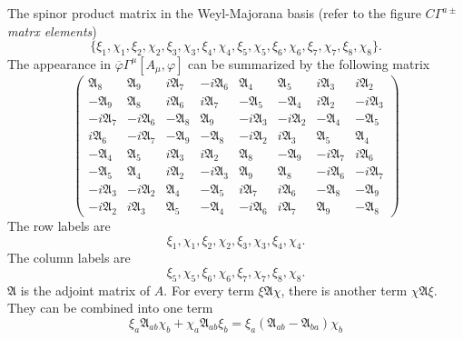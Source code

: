 
\begin{correct}
	The spinor product matrix in the Weyl-Majorana basis
	(refer to the figure \emph{$C\Gamma^{a\pm}$ matrx elements})
	\[
	\{\xi_1,\chi_1,\xi_2,\chi_2,\xi_3,\chi_3,\xi_4,\chi_4,
	\xi_5,\chi_5,\xi_6,\chi_6,\xi_7,\chi_7,\xi_8,\chi_8\}
	.\] 
	The appearance in $\overline{\varphi}\Gamma^\mu [A_\mu,\varphi]$
	can be summarized by the following matrix
	\begin{equation}
		\begin{pmatrix}
		\mathfrak{A}_8	& \mathfrak{A}_9 & i \mathfrak{A}_7 & -i \mathfrak{A}_6 & \mathfrak{A}_4 & \mathfrak{A}_5 & i \mathfrak{A}_3 & i \mathfrak{A}_2 \\
		- \mathfrak{A}_9& \mathfrak{A}_8 & i \mathfrak{A}_6 & i \mathfrak{A}_7 & - \mathfrak{A}_5 & -\mathfrak{A}_4 & i \mathfrak{A}_2 & -i \mathfrak{A}_3 \\
			-i \mathfrak{A}_7& -i \mathfrak{A}_6 & - \mathfrak{A}_8 & \mathfrak{A}_9 & -i \mathfrak{A}_3 & -i \mathfrak{A}_2 & - \mathfrak{A}_4 & - \mathfrak{A}_5 \\
			i \mathfrak{A}_6& -i \mathfrak{A}_7 & - \mathfrak{A}_9 & -\mathfrak{A}_8 & -i \mathfrak{A}_2 & i \mathfrak{A}_3 &  \mathfrak{A}_5 &  \mathfrak{A}_4 \\
			- \mathfrak{A}_4& \mathfrak{A}_5 & i \mathfrak{A}_3 & i \mathfrak{A}_2 & \mathfrak{A}_8 & - \mathfrak{A}_9 & -i \mathfrak{A}_7 & i \mathfrak{A}_6 \\
			- \mathfrak{A}_5& \mathfrak{A}_4 & i \mathfrak{A}_2 & -i \mathfrak{A}_3 & \mathfrak{A}_9 & \mathfrak{A}_8 & -i \mathfrak{A}_6 & -i \mathfrak{A}_7 \\
			-i \mathfrak{A}_3	& -i \mathfrak{A}_2 & \mathfrak{A}_4 & - \mathfrak{A}_5 & i \mathfrak{A}_7 & i \mathfrak{A}_6 & - \mathfrak{A}_8 & - \mathfrak{A}_9 \\
			-i \mathfrak{A}_2& i \mathfrak{A}_3 & \mathfrak{A}_5 & - \mathfrak{A}_4 & -i \mathfrak{A}_6 & i \mathfrak{A}_7 & \mathfrak{A}_9 & - \mathfrak{A}_8 
		\end{pmatrix}
	\end{equation}
The row labels are
\[
\xi_1,\chi_1,\xi_2,\chi_2,\xi_3,\chi_3,\xi_4,\chi_4
.\] 
The column labels are
\[
\xi_5,\chi_5,\xi_6,\chi_6,\xi_7,\chi_7,\xi_8,\chi_8
.\] 
$\mathfrak{A}$ is the adjoint matrix of $A$.
For every term $\xi \mathfrak{A} \chi$, there is another term
$\chi \mathfrak{A} \xi$.
They can be combined into one term
\[
	\xi_a \mathfrak{A}_{ab} \chi_b + \chi_a \mathfrak{A}_{ab} \xi_b
	= \xi_a (\mathfrak{A}_{ab} - \mathfrak{A}_{ba})\chi_b
\]
\end{correct}
